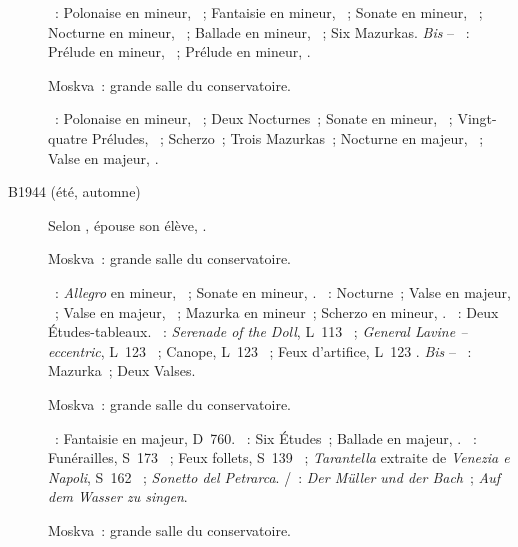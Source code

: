 \begin{description}
 \textsc{\Chopin{}}~: Polonaise en \kC \Sharp mineur,  ~;
 Fantaisie en \kF mineur, ~; Sonate en \kB \Flat mineur,
 ~; Nocturne en \kC mineur,  ~; Ballade en \kG
 mineur, ~; Six Mazurkas.
 \emph{Bis} -- \textsc{\Chopin{}}~: Prélude en \kB \Flat mineur, 
 ~; Prélude en \kE mineur,  .
 \item[\DateWithWeekDay{1944-07-20}]
 Moskva~: grande salle du conservatoire.

 \textsc{\Chopin{}}~: Polonaise en \kC \Sharp mineur,  ~;
 Deux Nocturnes~; Sonate en \kB \Flat mineur, ~; Vingt-quatre
 Préludes, ~; Scherzo~; Trois Mazurkas~; Nocturne en \kE \Flat
 majeur,  ~; Valse  en \kA \Flat majeur,
  .
 \item[B1944 (été, automne)]
 Selon \citeauthor{Berkovskaya13}, \VSofronitsky{} épouse son élève,
 \VDushinova{}.
 \item[\DateWithWeekDay{1944-10-26}]
 Moskva~: grande salle du conservatoire.

 \textsc{\Schumann{}}~: \emph{Allegro} en \kB mineur, ~; Sonate en
 \kF \Sharp mineur, .
 \textsc{\Chopin{}}~: Nocturne~; Valse  en \kD \Flat majeur,
  ~; Valse  en \kG \Flat majeur, 
 ~; Mazurka en \kB mineur~; Scherzo en \kB mineur, .
 \textsc{\Rachmaninov{}}~: Deux Études-tableaux.
 \textsc{\Debussy{}}~: \emph{Serenade of the Doll}, L~113 ~;
 \emph{General Lavine -- eccentric}, L~123 ~; Canope, L~123
 ~; Feux d'artifice, L~123 .
 \emph{Bis} -- \textsc{\Chopin{}}~: Mazurka~; Deux Valses.
 \item[\DateWithWeekDay{1944-11-21}]
 Moskva~: grande salle du conservatoire.

 \textsc{\Schubert{}}~: Fantaisie  en \kC majeur, D~760.
 \textsc{\Chopin{}}~: Six Études~; Ballade en \kA \Flat majeur, .
 \textsc{\Liszt{}}~: Funérailles, S~173 ~; Feux follets, S~139
 ~; \emph{Tarantella} extraite de \emph{Venezia e Napoli}, S~162
 ~; \emph{Sonetto del Petrarca}.
 \textsc{\Schubert{}/\Liszt{}}~: \emph{Der Müller und der Bach}~; \emph{Auf
 dem Wasser zu singen}.
 \item[\DateWithWeekDay{1944-12-12}]
 Moskva~: grande salle du conservatoire.


\end{description}
